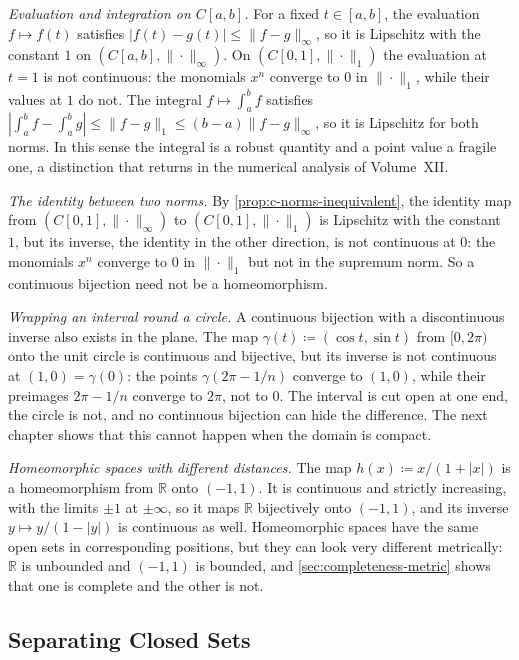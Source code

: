 \emph{Evaluation and integration on $C[a,b]$.} For a fixed $t\in[a,b]$, the evaluation $f\mapsto f(t)$ satisfies $|f(t)-g(t)|\le\|f-g\|_\infty$, so it is Lipschitz with the constant $1$ on $(C[a,b],\|\cdot\|_\infty)$. On $(C[0,1],\|\cdot\|_1)$ the evaluation at $t=1$ is not continuous: the monomials $x^n$ converge to $0$ in $\|\cdot\|_1$, while their values at $1$ do not. The integral $f\mapsto\int_a^bf$ satisfies $|\int_a^bf-\int_a^bg|\le\|f-g\|_1\le(b-a)\|f-g\|_\infty$, so it is Lipschitz for both norms. In this sense the integral is a robust quantity and a point value a fragile one, a distinction that returns in the numerical analysis of Volume~XII.

\emph{The identity between two norms.} By \cref{prop:c-norms-inequivalent}, the identity map from $(C[0,1],\|\cdot\|_\infty)$ to $(C[0,1],\|\cdot\|_1)$ is Lipschitz with the constant $1$, but its inverse, the identity in the other direction, is not continuous at $0$: the monomials $x^n$ converge to $0$ in $\|\cdot\|_1$ but not in the supremum norm. So a continuous bijection need not be a homeomorphism.

\emph{Wrapping an interval round a circle.} A continuous bijection with a discontinuous inverse also exists in the plane. The map $\gamma(t)\coloneqq(\cos t,\sin t)$ from $[0,2\pi)$ onto the unit circle is continuous and bijective, but its inverse is not continuous at $(1,0)=\gamma(0)$: the points $\gamma(2\pi-1/n)$ converge to $(1,0)$, while their preimages $2\pi-1/n$ converge to $2\pi$, not to $0$. The interval is cut open at one end, the circle is not, and no continuous bijection can hide the difference. The next chapter shows that this cannot happen when the domain is compact.

\emph{Homeomorphic spaces with different distances.} The map $h(x)\coloneqq x/(1+|x|)$ is a homeomorphism from $\mathbb R$ onto $(-1,1)$. It is continuous and strictly increasing, with the limits $\pm1$ at $\pm\infty$, so it maps $\mathbb R$ bijectively onto $(-1,1)$, and its inverse $y\mapsto y/(1-|y|)$ is continuous as well. Homeomorphic spaces have the same open sets in corresponding positions, but they can look very different metrically: $\mathbb R$ is unbounded and $(-1,1)$ is bounded, and \cref{sec:completeness-metric} shows that one is complete and the other is not.

\subsection{Separating Closed Sets}

